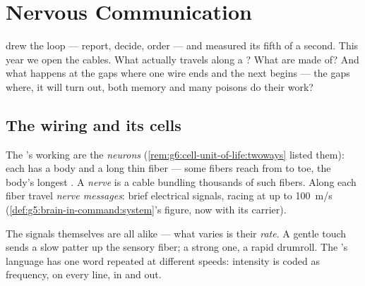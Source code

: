 \chapter{Nervous Communication}\label{ch:g8:nervous-communication}

 drew the loop --- report,
decide, order --- and measured its fifth of a second. This
year we open the cables. What actually travels along a
? What are  made of? And what happens at the
gaps where one wire ends and the next begins --- the gaps
where, it will turn out, both memory and many poisons do
their work?

\section{The wiring and its cells}

\begin{definition}\label{def:g8:nervous-communication:neuron}
The 's working  are the
\emph{neurons}
(\cref{rem:g6:cell-unit-of-life:twoways} listed them):
each has a  body and a long thin fiber --- some fibers
reach from  to toe, the body's longest . A
\emph{nerve} is a cable bundling thousands of
such fibers. Along each fiber travel \emph{nerve
messages}: brief electrical signals,
racing at up to \qty{100}{m/s}
(\cref{def:g5:brain-in-command:system}'s figure, now with
its carrier).
\end{definition}

\begin{proposition}\label{prop:g8:nervous-communication:code}
The signals themselves are all alike --- what varies is
their \emph{rate}. A gentle touch sends a slow patter up
the sensory fiber; a strong one, a rapid drumroll. The
's language has one word repeated at
different speeds: intensity is coded as frequency, on
every line, in and out.
\end{proposition}
\admitted

